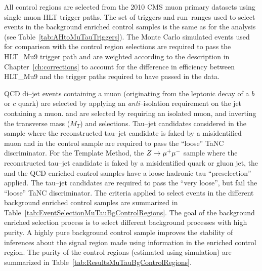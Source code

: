 All control regions are selected from the 2010 CMS muon primary datasets using
single muon HLT trigger paths.  The set of triggers and run--ranges used to select events in the
background enriched control samples is the same as for the analysis (see
Table~\ref{tab:AHtoMuTauTriggers}).  The Monte Carlo simulated events used for
comparison with the control region selections are required to pass the HLT\_Mu9
trigger path and are weighted according to the description in
Chapter~\ref{ch:corrections} to account for the difference in
efficiency between HLT\_Mu9 and the trigger paths required to have passed in the
data.

QCD di--jet events containing a muon (originating from the leptonic decay of a
$b$ or $c$ quark) are selected by applying an \emph{anti}--isolation requirement
on the jet containing a muon.  \WpJets and \ttbarpJets are selected by requiring
an isolated muon, and inverting the transverse mass ($M_T$) and \Pzeta
selections.   Tau--jet candidates considered in the \ZMM sample where the
reconstructed tau--jet candidate is faked by a misidentified muon and in the
\ttbarpJets control sample are required to pass the ``loose'' TaNC
discriminator.  For the Template Method, the $Z\to\mu^+\mu^-$ sample where the
reconstructed tau--jet candidate is faked by a misidentified quark or gluon jet,
the \WpJets and the QCD enriched control samples have a loose hadronic tau
``preselection'' applied. The tau--jet candidates are required to pass the
``very loose'', but fail the ``loose'' TaNC discriminator.  The criteria applied
to select events in the different background enriched control samples are
summarized in Table~\ref{tab:EventSelectionMuTauBgControlRegions}.  The goal of
the background enriched selection process is to select different background
processes with high purity.  A highly pure background control sample improves
the stability of inferences about the signal region made using information in
the enriched control region.  The purity of the control regions (estimated using
simulation) are summarized in Table~\ref{tab:ResultsMuTauBgControlRegions}.
%
